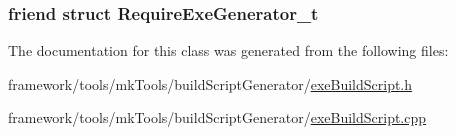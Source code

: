 \subsubsection[{\texorpdfstring{Require\+Exe\+Generator\+\_\+t}{RequireExeGenerator_t}}]{\setlength{\rightskip}{0pt plus 5cm}friend struct {\bf Require\+Exe\+Generator\+\_\+t}\hspace{0.3cm}{\ttfamily [friend]}}\hypertarget{classninja_1_1_exe_build_script_generator__t_a17052a652c8e90412d7d7337cc2cd6a8}{}\label{classninja_1_1_exe_build_script_generator__t_a17052a652c8e90412d7d7337cc2cd6a8}


The documentation for this class was generated from the following files\+:\begin{DoxyCompactItemize}
\item 
framework/tools/mk\+Tools/build\+Script\+Generator/\hyperlink{exe_build_script_8h}{exe\+Build\+Script.\+h}\item 
framework/tools/mk\+Tools/build\+Script\+Generator/\hyperlink{exe_build_script_8cpp}{exe\+Build\+Script.\+cpp}\end{DoxyCompactItemize}
